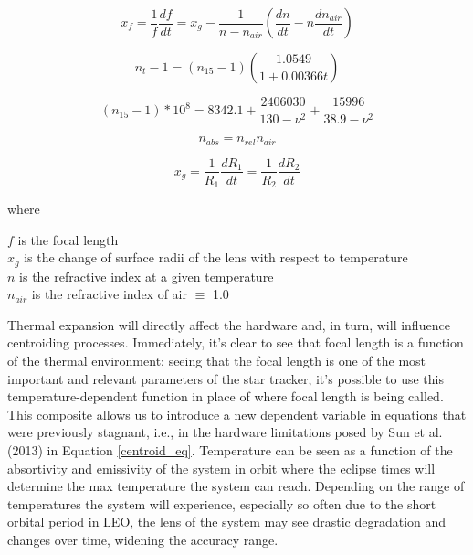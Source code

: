 \begin{equation} \label{temp_and_focal_length_eq}
    x_f = \frac{1}{f} \frac{df}{dt} = x_g - \frac{1}{n - n_{air}} \left( \frac{dn}{dt} - n \frac{dn_{air}}{dt} \right)
\end{equation}

\begin{equation} \label{n_at_temp}
    n_t - 1 = (n_{15} - 1)\left(\frac{1.0549}{1 + 0.00366t}\right)
\end{equation}

\begin{equation} \label{n_at_15}
    (n_{15} - 1) * 10^8 = 8342.1 + \frac{2406030}{130 - \nu^2} + \frac{15996}{38.9-\nu^2}
\end{equation}

\begin{equation}
    n_{abs} = n_{rel}n_{air}
\end{equation}

\begin{equation}
    x_g = \frac{1}{R_1} \frac{dR_1}{dt} = \frac{1}{R_2} \frac{dR_2}{dt}
\end{equation}

where 
\begin{center}
    $f$ is the focal length \\
    $x_g$ is the change of surface radii of the lens with respect to temperature \\
    $n$ is the refractive index at a given temperature \\
    $n_{air}$ is the refractive index of air $\equiv$ 1.0
\end{center}

\par \qquad Thermal expansion will directly affect the hardware and, in turn, will influence centroiding processes.
Immediately, it's clear to see that focal length is a function of the thermal environment; seeing that the focal length is one of the most important and relevant parameters of the star tracker, it's possible to use this temperature-dependent function in place of where focal length is being called.
This composite allows us to introduce a new dependent variable in equations that were previously stagnant, i.e., in the hardware limitations posed by Sun et al. (2013) in Equation \ref{centroid_eq}.
Temperature can be seen as a function of the absortivity and emissivity of the system in orbit where the eclipse times will determine the max temperature the system can reach.
Depending on the range of temperatures the system will experience, especially so often due to the short orbital period in LEO, the lens of the system may see drastic degradation and changes over time, widening the accuracy range.

